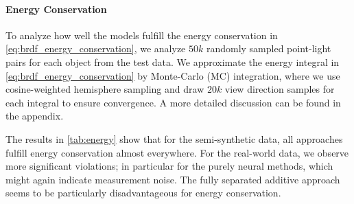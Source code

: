 \paragraph{Energy Conservation}

To analyze how well the models fulfill the energy conservation in \cref{eq:brdf_energy_conservation}, we analyze $50k$ randomly sampled point-light pairs for each object from the test data. We approximate the energy integral in \cref{eq:brdf_energy_conservation} by Monte-Carlo (MC) integration, where we use cosine-weighted hemisphere sampling and draw $20k$ view direction samples for each integral to ensure convergence. A more detailed discussion can be found in the appendix.

The results in \cref{tab:energy} show that for the semi-synthetic data, all approaches fulfill energy conservation almost everywhere. For the real-world data, we observe more significant violations; in particular for the purely neural methods, which might again indicate measurement noise. The fully separated additive approach seems to be particularly disadvantageous for energy conservation.

